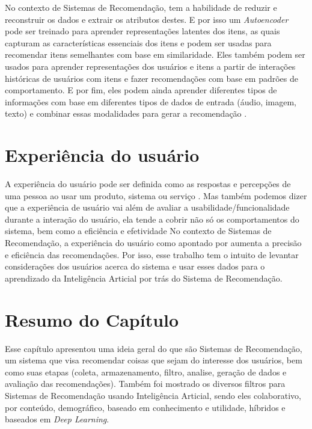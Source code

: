 No contexto de Sistemas de Recomendação, tem a habilidade de reduzir e reconstruir os dados e extrair os atributos destes.
E por isso um \textit{Autoencoder} pode ser treinado para aprender representações latentes dos itens, as quais capturam as características
essenciais dos itens e podem ser usadas para recomendar itens semelhantes com base em similaridade. Eles também podem
ser usados para aprender representações dos usuários e itens a partir de interações históricas de usuários com itens e fazer
recomendações com base em padrões de comportamento. E por fim, eles podem ainda aprender diferentes tipos de informações com
base em diferentes tipos de dados de entrada (áudio, imagem, texto) e combinar essas modalidades para gerar a recomendação \cite{zhang2020autoencoder}.


\section{Experiência do usuário}\label{sec:expus}
A experiência do usuário pode ser definida como as respostas e percepções de uma pessoa ao usar um produto, sistema ou serviço
\cite{iso9241-210}. Mas também podemos dizer que a experiência de usuário vai além de avaliar a usabilidade/funcionalidade durante
a interação do usuário, ela tende a cobrir não só os comportamentos do sistema, bem como a eficiência e efetividade \cite{allam2013user}
No contexto de Sistemas de Recomendação, a experiência do usuário como apontado por \cite{8673410} aumenta a precisão e eficiência
das recomendações. Por isso, esse trabalho tem o intuito de levantar considerações dos usuários acerca do sistema e usar esses
dados para o aprendizado da Inteligência Articial por trás do Sistema de Recomendação. 

\section{Resumo do Capítulo}\label{sec:resrefteor}

Esse capítulo apresentou uma ideia geral do que são Sistemas de Recomendação, um sistema que visa recomendar coisas que 
sejam do interesse dos usuários, bem como suas etapas (coleta, armazenamento, filtro, analise, geração de dados e 
avaliação das recomendações). Também foi mostrado os diversos filtros para Sistemas de Recomendação usando Inteligência 
Articial, sendo eles colaborativo, por conteúdo, demográfico, baseado em conhecimento e utilidade, híbridos e baseados em
\textit{Deep Learning}.

